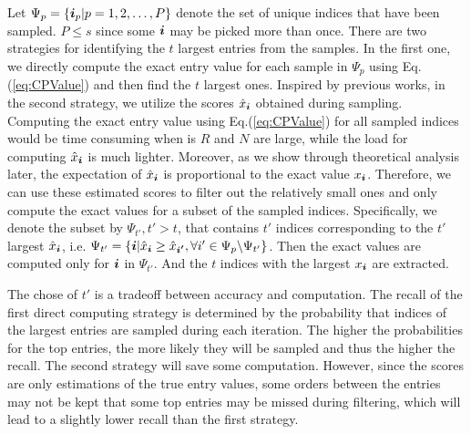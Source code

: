\documentclass[letterpaper]{article}
\newcommand{\V}[1]{{\boldsymbol{{\MakeLowercase{#1}}}}}
\newcommand{\predx}{\hat{x}_{\V{i}}}
\newcommand{\Eqn}[1]{Eq.(\ref{eq:#1})}
\begin{document}
Let $\Psi_p = \{\V{i}_p|p = 1,2,\ldots,P\}$ 
denote the set of unique indices that have been sampled. 
$P\leq s$ since some $\V{i}$ may be picked more than once. 
There are two strategies for identifying the $t$ largest entries from the samples. 
In the first one, 
we directly compute the exact entry value for each sample in $\Psi_{p}$ using \Eqn{CPValue}
and then find the $t$ largest ones. 
Inspired by previous works, in the second strategy, 
we utilize the scores $\predx$ obtained during sampling. 
Computing the exact entry value using \Eqn{CPValue} for all sampled indices 
would be time consuming when is $R$ and $N$ are large, 
while the load for computing $\predx$ is much lighter. 
Moreover, as we show through theoretical analysis later, 
the expectation of $\predx$ is proportional to the exact value $x_{\V{i}}$. 
Therefore, we can use these estimated scores to filter out the relatively small ones 
and only compute the exact values for a subset of the sampled indices. 
Specifically, we denote the subset by $\Psi_{t'},t'>t$, 
that contains $t'$ indices corresponding to the $t'$ largest $\predx$, i.e.
$
    \Psi_{t'} = \{ \V{i} | \predx \geq \hat{x}_{\V{i'}},
                           \forall i'\in \Psi_{p} \backslash \Psi_{t'}
                \}
$.
Then the exact values  are computed only for $\V{i}$ in $\Psi_{t'}$. 
And the $t$ indices with the largest $x_{\V{i}}$ are extracted.

The chose of $t'$ is a tradeoff between accuracy and computation. 
The recall of the first direct computing strategy is determined by the probability 
that indices of the largest entries are sampled during each iteration. 
The higher the probabilities for the top entries, the more likely they will be sampled 
and thus the higher the recall. 
The second strategy will save some computation. 
However, since the scores are only estimations of the true entry values, 
some orders between the entries may not be kept 
that some top entries may be missed during filtering, 
which will lead to a slightly lower recall than the first strategy.
\end{document}
